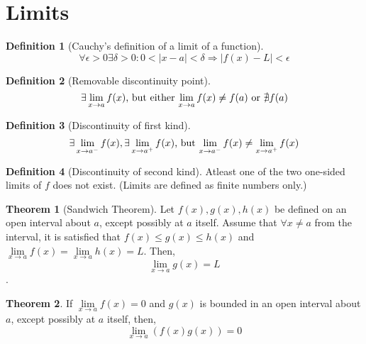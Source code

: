 \documentclass[fleqn, a5paper, 11pt]{article}
\theoremstyle{definition}
\newtheorem{definition}{Definition}
\theoremstyle{theorem}
\newtheorem{theorem}{Theorem}
\theoremstyle{remark}
\begin{document}
\section{Limits}

\begin{definition}[Cauchy's definition of a limit of a function]
	\begin{equation*}
	\forall \epsilon > 0 \exists \delta > 0 : 0 < |x - a| < \delta \Rightarrow |f(x) - L| < \epsilon
	\end{equation*}
\end{definition}

\begin{definition}[Removable discontinuity point]
	\begin{equation*}
		\exists \lim\limits_{x \rightarrow a} f(x)$, but either $\lim\limits_{x \rightarrow a} f(x) \neq f(a)$ or $\nexists f(a)
	\end{equation*}
\end{definition}

\begin{definition}[Discontinuity of first kind]
	\begin{equation*}
		\exists \lim\limits_{x \rightarrow a^-} f(x), \exists \lim\limits_{x \rightarrow a^+} f(x)$, but $\lim\limits_{x \rightarrow a^-} f(x) \neq \lim\limits_{x \rightarrow a^+} f(x)
	\end{equation*}
\end{definition}

\begin{definition}[Discontinuity of second kind]
	Atleast one of the two one-sided limits of $f$ does not exist. (Limits are defined as finite numbers only.)
\end{definition}

\begin{theorem}[Sandwich Theorem] \label{Sandwich Theorem}
	Let $f(x), g(x), h(x)$ be defined on an open interval about $a$, except possibly at $a$ itself. Assume that $\forall x \neq a$ from the interval, it is satisfied that $f(x) \leq g(x) \leq h(x)$ and $\lim\limits_{x \rightarrow a} f(x) = \lim\limits_{x \rightarrow a} h(x) = L$. Then, 
	\begin{equation*}
		\lim\limits_{x \rightarrow a} g(x) = L
	\end{equation*}.
\end{theorem}

\begin{theorem}
	If $\lim\limits_{x \rightarrow a} f(x) = 0$ and $g(x)$ is bounded in an open interval about $a$, except possibly at $a$ itself, then, 
	\begin{equation*}
		\lim\limits_{x \rightarrow a}(f(x)g(x)) = 0
	\end{equation*}
\end{theorem}
\end{document}
